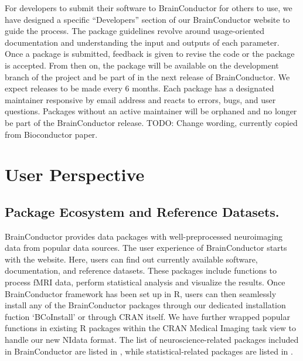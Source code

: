 \documentclass{nature}
\begin{document}
For developers to submit their software to BrainConductor for others to use,
we have designed a specific ``Developers'' section of our BrainConductor website
to guide the process. The package guidelines revolve around usage-oriented
documentation and understanding the input and outputs of each parameter.
 Once
a package is submitted, feedback is given to revise the code or the package is
accepted.
From then on, the package will be available on the
development branch of the project and be part of in the next release of
BrainConductor.
We expect releases to be made every 6 months.
Each package has a designated maintainer responsive by email address and reacts
to
errors, bugs, and user questions. Packages without an active maintainer will be
orphaned and no longer be part of the BrainConductor release.
{\color{red}TODO: Change wording, currently copied from Bioconductor paper.}


\section{User Perspective}


\subsection{Package Ecosystem and Reference Datasets.}
BrainConductor provides data packages with well-preprocessed neuroimaging data
from popular data sources.
The user experience of BrainConductor starts with the website. Here, users can
find out currently available software, documentation, and reference datasets.
These packages include functions to process fMRI data, perform statistical
analysis and visualize the results.
Once BrainConductor framework has been set up in R, users can then
seamlessly install any of the BrainConductor packages through our
dedicated installation fuction `BCoInstall' or through CRAN itself.
We have further wrapped popular functions in existing R packages
within the CRAN Medical Imaging task view to handle our new NIdata format.
The list of neuroscience-related packages included in BrainConductor are listed
in , while statistical-related packages are listed in
.
\end{document}
